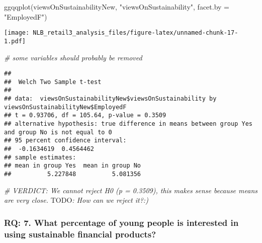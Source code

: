\documentclass[
]{article}
\newenvironment{Shaded}{\begin{snugshade}}{\end{snugshade}}
\newcommand{\AlertTok}[1]{\textcolor[rgb]{0.94,0.16,0.16}{#1}}
\newcommand{\AttributeTok}[1]{\textcolor[rgb]{0.77,0.63,0.00}{#1}}
\newcommand{\CommentTok}[1]{\textcolor[rgb]{0.56,0.35,0.01}{\textit{#1}}}
\newcommand{\ConstantTok}[1]{\textcolor[rgb]{0.00,0.00,0.00}{#1}}
\newcommand{\FunctionTok}[1]{\textcolor[rgb]{0.00,0.00,0.00}{#1}}
\newcommand{\NormalTok}[1]{#1}
\newcommand{\SpecialCharTok}[1]{\textcolor[rgb]{0.00,0.00,0.00}{#1}}
\newcommand{\StringTok}[1]{\textcolor[rgb]{0.31,0.60,0.02}{#1}}
\begin{document}
\begin{Shaded}
\begin{Highlighting}[]
\FunctionTok{ggqqplot}\NormalTok{(viewsOnSustainabilityNew, }\StringTok{"viewsOnSustainability"}\NormalTok{, }\AttributeTok{facet.by =} \StringTok{"EmployedF"}\NormalTok{)}
\end{Highlighting}
\end{Shaded}

\texttt{[image: NLB\_retail3\_analysis\_files/figure-latex/unnamed-chunk-17-1.pdf]}

\begin{Shaded}
\begin{Highlighting}[]
\CommentTok{\# some variables should probably be removed}
\end{Highlighting}
\end{Shaded}

\begin{Shaded}
\end{Shaded}

\begin{verbatim}
## 
##  Welch Two Sample t-test
## 
## data:  viewsOnSustainabilityNew$viewsOnSustainability by viewsOnSustainabilityNew$EmployedF
## t = 0.93706, df = 105.64, p-value = 0.3509
## alternative hypothesis: true difference in means between group Yes and group No is not equal to 0
## 95 percent confidence interval:
##  -0.1634619  0.4564462
## sample estimates:
## mean in group Yes  mean in group No 
##          5.227848          5.081356
\end{verbatim}

\begin{Shaded}
\begin{Highlighting}[]
\CommentTok{\# VERDICT: We cannot reject  H0 (p = 0.3509), this makes sense because means are very close. }\AlertTok{TODO}\CommentTok{: How can we reject it?:)}
\end{Highlighting}
\end{Shaded}

\hypertarget{rq-7.-what-percentage-of-young-people-is-interested-in-using-sustainable-financial-products}{%
\subsubsection{RQ: 7. What percentage of young people is interested in
using sustainable financial
products?}\label{rq-7.-what-percentage-of-young-people-is-interested-in-using-sustainable-financial-products}}
\end{document}
